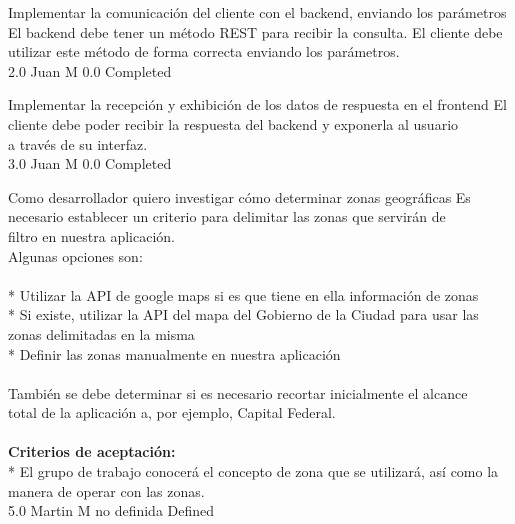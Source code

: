 		{Implementar la comunicación del cliente con el backend, enviando los parámetros} %
		{El backend debe tener un método REST para recibir la consulta. El cliente debe\\
utilizar este método de forma correcta enviando los parámetros.\\
} %
		{2.0} %
		{Juan M} %
		{0.0} %
		{Completed} %

		{Implementar la recepción y exhibición de los datos de respuesta en el frontend} %
		{El cliente debe poder recibir la respuesta del backend y exponerla al usuario\\
a través de su interfaz.\\
} %
		{3.0} %
		{Juan M} %
		{0.0} %
		{Completed} %


\vspace{20pt}

	{Como desarrollador quiero investigar cómo determinar zonas geográficas} %
	{Es necesario establecer un criterio para delimitar las zonas que servirán de\\
filtro en nuestra aplicación.\\
Algunas opciones son:\\
  \\
* Utilizar la API de google maps si es que tiene en ella información de zonas\\
* Si existe, utilizar la API del mapa del Gobierno de la Ciudad para usar las zonas delimitadas en la misma\\
* Definir las zonas manualmente en nuestra aplicación\\
  \\
También se debe determinar si es necesario recortar inicialmente el alcance\\
total de la aplicación a, por ejemplo, Capital Federal.\\
  \\
\textbf{Criterios de aceptación:}\\
* El grupo de trabajo conocerá el concepto de zona que se utilizará, así como la manera de operar con las zonas.  \\
} %
	{} %
	{5.0} %
	{Martin M} %
	{no definida} %
	{Defined} %


